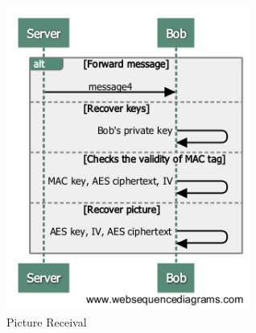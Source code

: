 	    
	    \begin{figure}[H]
	    
	      \centering
	      \includegraphics[width=8cm]{images/architecture/receive}
	      \caption{Picture Receival}
	     
	    \end{figure}

	    
	    
	    




	  
      
      
     
      


	
  